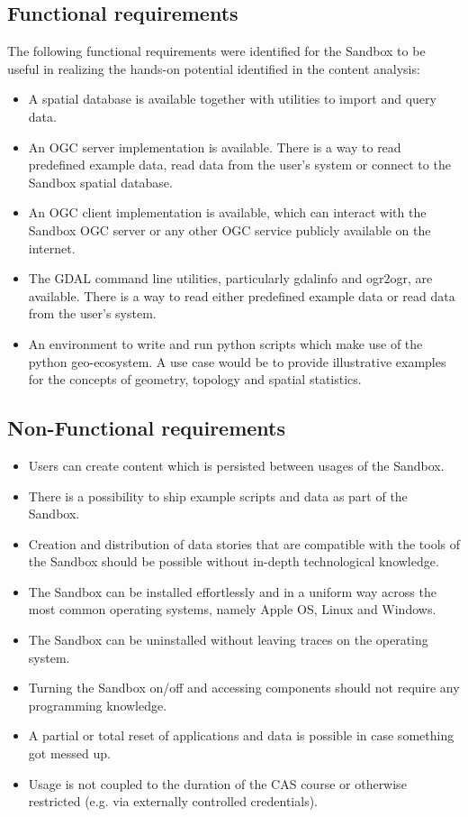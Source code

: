 \documentclass[11pt, a4paper, oneside, parskip=full-]{scrartcl}
\begin{document}
\subsection{Functional requirements}
The following functional requirements were identified for the Sandbox to be
useful in realizing the hands-on potential identified in the content analysis:
\begin{itemize}
  \item A spatial database is available together with utilities to import and
  query data.
  \item An OGC server implementation is available. There is a way to read
  predefined example data, read data from the user's system or connect to the
  Sandbox spatial database.
  \item An OGC client implementation is available, which can interact with the
  Sandbox OGC server or any other OGC service publicly available on the
  internet.
  \item The GDAL command line utilities, particularly gdalinfo and ogr2ogr, are
  available. There is a way to read either predefined example data or read data
  from the user's system.
  \item An environment to write and run python scripts which make use of the
  python geo-ecosystem. A use case would be to provide illustrative examples for
  the concepts of geometry, topology and spatial statistics.
\end{itemize}

\subsection{Non-Functional requirements}
\begin{itemize}
  \item Users can create content which is persisted between usages of the
  Sandbox.
  \item There is a possibility to ship example scripts and data as part of the
  Sandbox.
  \item Creation and distribution of data stories that are compatible with the
  tools of the Sandbox should be possible without in-depth technological
  knowledge.
  \item The Sandbox can be installed effortlessly and in a uniform way across
  the most common operating systems, namely Apple OS, Linux and Windows.
  \item The Sandbox can be uninstalled without leaving traces on the operating
  system.
  \item Turning the Sandbox on/off and accessing components should not require
  any programming knowledge.
  \item A partial or total reset of applications and data is possible in case
  something got messed up.
  \item Usage is not coupled to the duration of the CAS course or otherwise
  restricted (e.g. via externally controlled credentials).
\end{itemize}
\end{document}

